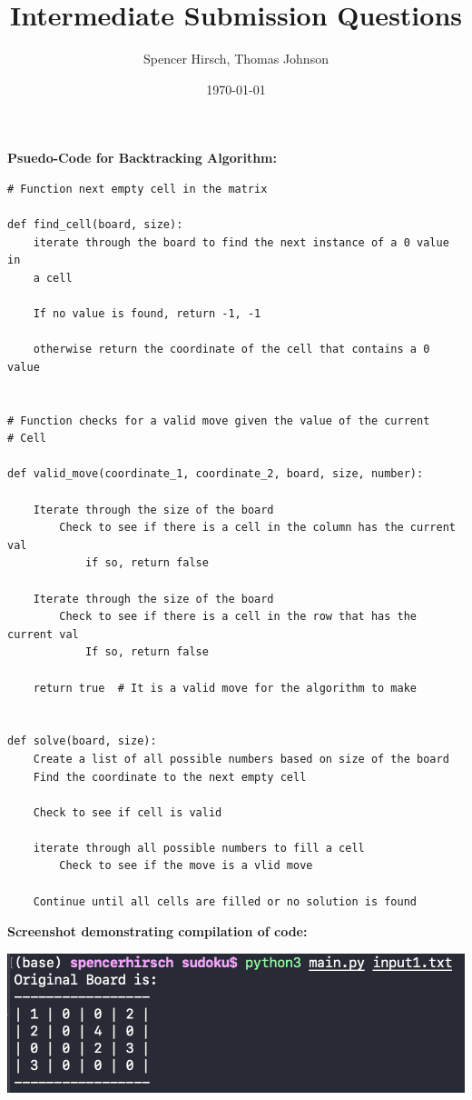 \documentclass{article}
\begin{document}
\title{\textbf{Intermediate Submission Questions}}
\author{Spencer Hirsch, Thomas Johnson}
\date{\today}

\maketitle

\textbf{Psuedo-Code for Backtracking Algorithm:}

\medskip

\begin{lstlisting}[frame=single]
# Function next empty cell in the matrix

def find_cell(board, size):
	iterate through the board to find the next instance of a 0 value in
	a cell

	If no value is found, return -1, -1

	otherwise return the coordinate of the cell that contains a 0 value	


# Function checks for a valid move given the value of the current
# Cell

def valid_move(coordinate_1, coordinate_2, board, size, number):

	Iterate through the size of the board
		Check to see if there is a cell in the column has the current val
			if so, return false

	Iterate through the size of the board
		Check to see if there is a cell in the row that has the current val
			If so, return false

	return true  # It is a valid move for the algorithm to make


def solve(board, size):
	Create a list of all possible numbers based on size of the board
	Find the coordinate to the next empty cell
	
	Check to see if cell is valid

	iterate through all possible numbers to fill a cell
		Check to see if the move is a vlid move
	
	Continue until all cells are filled or no solution is found
\end{lstlisting}

\pagebreak


\textbf{Screenshot demonstrating compilation of code:}

\bigskip

\includegraphics{compilation.png}
\end{document}
